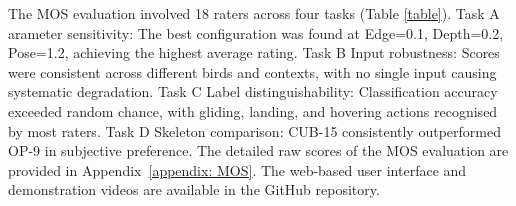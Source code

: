 \documentclass[final-report]{report-template}
\begin{document}



The MOS evaluation involved 18 raters across four tasks (Table \ref{table}).
Task A arameter sensitivity: The best configuration was found at Edge=0.1, Depth=0.2, Pose=1.2, achieving the highest average rating.  
Task B Input robustness: Scores were consistent across different birds and contexts, with no single input causing systematic degradation.  
Task C Label distinguishability: Classification accuracy exceeded random chance, with gliding, landing, and hovering actions recognised by most raters.  
Task D Skeleton comparison: CUB-15 consistently outperformed OP-9 in subjective preference. 
The detailed raw scores of the MOS evaluation are provided in Appendix~\ref{appendix: MOS}.
The web-based user interface and demonstration videos are available in the GitHub repository.
\end{document}
